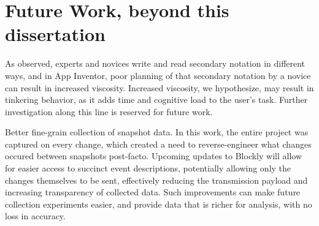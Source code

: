  \section{Future Work, beyond this dissertation} %
\label{sec:futurework}


As \citet{petre-2006} observed, experts and novices write and read secondary notation in different ways, and in App Inventor, poor planning of that secondary notation by a novice can result in increased viscosity. Increased viscosity, we hypothesize, may result in tinkering behavior, as it adds time and cognitive load to the user's task. Further investigation along this line is reserved for future work.

Better fine-grain collection of snapshot data. In this work, the entire project was captured on every change, which created a need to reverse-engineer what changes occured between snapshots post-facto. Upcoming updates to Blockly will allow for easier access to succinct event descriptions, potentially allowing only the changes themselves to be sent, effectively reducing the transmission payload and increasing transparency of collected data. Such improvements can make future collection experiments easier, and provide data that is richer for analysis, with no loss in accuracy. 
